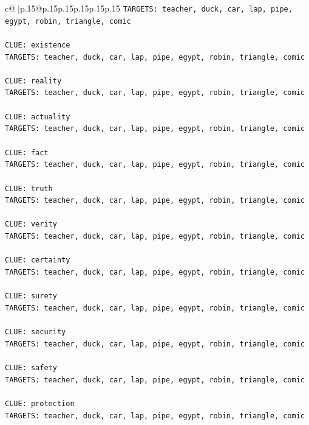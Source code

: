\documentclass{article}
\begin{document}
{\begin{supertabular}{c@{$\;$}|p{.15\linewidth}@{}p{.15\linewidth}p{.15\linewidth}p{.15\linewidth}p{.15\linewidth}p{.15\linewidth}}
{{{\texttt{TARGETS: teacher, duck, car, lap, pipe, egypt, robin, triangle, comic} \\
\\ 
\texttt{CLUE: existence} \\
\texttt{TARGETS: teacher, duck, car, lap, pipe, egypt, robin, triangle, comic} \\
\\ 
\texttt{CLUE: reality} \\
\texttt{TARGETS: teacher, duck, car, lap, pipe, egypt, robin, triangle, comic} \\
\\ 
\texttt{CLUE: actuality} \\
\texttt{TARGETS: teacher, duck, car, lap, pipe, egypt, robin, triangle, comic} \\
\\ 
\texttt{CLUE: fact} \\
\texttt{TARGETS: teacher, duck, car, lap, pipe, egypt, robin, triangle, comic} \\
\\ 
\texttt{CLUE: truth} \\
\texttt{TARGETS: teacher, duck, car, lap, pipe, egypt, robin, triangle, comic} \\
\\ 
\texttt{CLUE: verity} \\
\texttt{TARGETS: teacher, duck, car, lap, pipe, egypt, robin, triangle, comic} \\
\\ 
\texttt{CLUE: certainty} \\
\texttt{TARGETS: teacher, duck, car, lap, pipe, egypt, robin, triangle, comic} \\
\\ 
\texttt{CLUE: surety} \\
\texttt{TARGETS: teacher, duck, car, lap, pipe, egypt, robin, triangle, comic} \\
\\ 
\texttt{CLUE: security} \\
\texttt{TARGETS: teacher, duck, car, lap, pipe, egypt, robin, triangle, comic} \\
\\ 
\texttt{CLUE: safety} \\
\texttt{TARGETS: teacher, duck, car, lap, pipe, egypt, robin, triangle, comic} \\
\\ 
\texttt{CLUE: protection} \\
\texttt{TARGETS: teacher, duck, car, lap, pipe, egypt, robin, triangle, comic} \\
}}}
\end{supertabular}}
\end{document}
